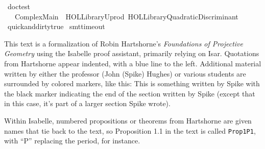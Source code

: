 %
\begin{isabellebody}%
%
%
\isadelimtheory
%
\endisadelimtheory
%
\isatagtheory
{}\isamarkupfalse%
\ {\isachardoublequoteopen}doctest{\isachardoublequoteclose}\isanewline
\ \ \ Complex{\isacharunderscore}{\kern0pt}Main\ \ {\isachardoublequoteopen}HOL{\isacharminus}{\kern0pt}Library{\isachardot}{\kern0pt}Uprod{\isachardoublequoteclose}\ {\isachardoublequoteopen}HOL{\isacharminus}{\kern0pt}Library{\isachardot}{\kern0pt}Quadratic{\isacharunderscore}{\kern0pt}Discriminant{\isachardoublequoteclose}\ \isanewline
\isanewline
{}%
\endisatagtheory
{\isafoldtheory}%
%
\isadelimtheory
\isanewline
%
\endisadelimtheory
\isanewline
\isanewline
{}\isamarkupfalse%
\ {\isacharbrackleft}{\kern0pt}{\isacharbrackleft}{\kern0pt}quick{\isacharunderscore}{\kern0pt}and{\isacharunderscore}{\kern0pt}dirty{\isacharequal}{\kern0pt}true{\isacharbrackright}{\kern0pt}{\isacharbrackright}{\kern0pt}\isanewline
{}\isamarkupfalse%
\ {\isacharbrackleft}{\kern0pt}{\isacharbrackleft}{\kern0pt}smt{\isacharunderscore}{\kern0pt}timeout\ {\isacharequal}{\kern0pt}\ {}{}{}{}{\isacharbrackright}{\kern0pt}{\isacharbrackright}{\kern0pt}%
\isadelimdocument
%
\endisadelimdocument
%
\isatagdocument
%
\isamarkuptrue%
%
\endisatagdocument
{\isafolddocument}%
%
\isadelimdocument
%
\endisadelimdocument
%
\begin{isamarkuptext}%
\spike
This text is a formalization of Robin Hartshorne's \emph{Foundations of Projective Geometry}
using the Isabelle proof assistant, primarily relying on Isar. Quotations 
from Hartshorne appear indented, with a blue line to the left. Additional material 
written by either the professor (John (Spike) Hughes) or various students are surrounded by colored 
markers, like this:
\spike
This is something written by Spike
\done
with the black marker indicating the end of the section written by Spike (except that in this case, 
it's part of a larger section Spike wrote). 

Within Isabelle, numbered propositions or theorems from Hartshorne are given names that tie back 
to the text, so Proposition 1.1 in the text is called \texttt{Prop1P1}, with ``P'' replacing the period, 
for instance. 


\end{isamarkuptext}
\end{isabellebody}
